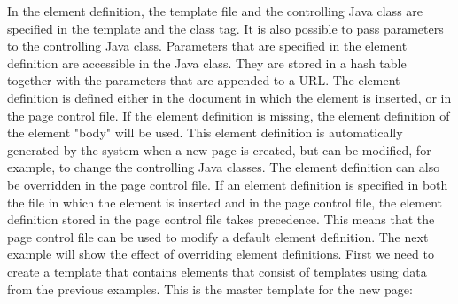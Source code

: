 In the element definition, the template file and the controlling Java
class are specified in the template and the class tag. It is also
possible to pass parameters to the controlling Java class. Parameters
that are specified in the element definition are accessible in the Java
class. They are stored in a hash table together with the parameters
that are appended to a URL.
The element definition is defined either in the document in which the
element is inserted, or in the page control file. If the element
definition is missing, the element definition of the element "body"
will be used. This element definition is automatically generated by the
system when a new page is created, but can be modified, for example, to
change the controlling Java classes. The element definition can also be
overridden in the page control file. If an element definition is
specified in both the file in which the element is inserted and in the
page control file, the element definition stored in the page control
file takes precedence. This means that the page control file can be
used to modify a default element definition.
The next example will show the effect of overriding element definitions.
First we need to create a template that contains elements that consist
of templates using data from the previous examples. This is the master
template for the new page:

